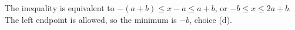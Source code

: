 The inequality is equivalent to $-(a+b)\le x-a\le a+b$, or $-b\le x\le 2a+b$. The left endpoint is allowed, so the minimum is $\boxed{-b}$, choice (d).
